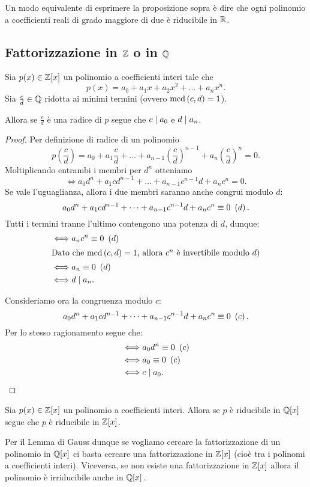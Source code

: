 Un modo equivalente di esprimere la proposizione sopra è dire che ogni polinomio a coefficienti reali di grado maggiore di due è riducibile in $\mathbb{R}$.

\subsection{Fattorizzazione in $\mathbb{Z}$ o in $\mathbb{Q}$}

\begin{proposition}
    Sia $p(x) \in \mathbb{Z}[x]$ un polinomio a coefficienti interi tale che \[
        p(x) = a_0 + a_1x + a_2x^2 + \dots + a_nx^n.    
    \] Sia $\frac{c}{d} \in \mathbb{Q}$ ridotta ai minimi termini (ovvero $\operatorname{mcd}\left(c, d\right) = 1$). 
    
    Allora se $\frac{c}{d}$ è una radice di $p$ segue che $c \mid a_0$ e $d \mid a_n$.
\end{proposition}
\begin{proof}
    Per definizione di radice di un polinomio \[
        p\left(\frac{c}{d}\right) = a_0 + a_1\frac{c}{d} + \dots + a_{n-1}\left(\frac{c}{d}\right)^{n-1} + a_n\left(\frac{c}{d}\right)^n = 0.
    \]
    Moltiplicando entrambi i membri per $d^n$ otteniamo \[
        \iff a_0d^n + a_1cd^{n-1} + \dots + a_{n-1}c^{n-1}d + a_nc^n = 0.
    \]
    Se vale l'uguaglianza, allora i due membri saranno anche congrui modulo $d$: \[
        a_0d^n + a_1cd^{n-1} + \dots + a_{n-1}c^{n-1}d + a_nc^n \equiv 0 \ \left(d\right).
    \]
    Tutti i termini tranne l'ultimo contengono una potenza di $d$, dunque:
    \begin{align*}
        \iff &a_nc^n \equiv 0 \ \left(d\right) \\
        \intertext{Dato che $\operatorname{mcd}\left(c, d\right) = 1$, allora $c^n$ è invertibile modulo $d$)}
        \iff &a_n \equiv 0 \ \left(d\right)\\
        \iff &d \mid a_n.
    \end{align*}

    Consideriamo ora la congruenza modulo $c$: \[
        a_0d^n + a_1cd^{n-1} + \dots + a_{n-1}c^{n-1}d + a_nc^n \equiv 0 \ \left(c\right).
    \]
    Per lo stesso ragionamento segue che:
    \begin{align*}
        \iff &a_0d^n \equiv 0 \ \left(c\right)\\
        \iff &a_0 \equiv 0 \ \left(c\right) \\
        \iff &c \mid a_0. \qedhere
    \end{align*}
\end{proof}

\begin{theorem}
     \label{lemma_di_Gauss}
    Sia $p(x) \in \mathbb{Z}[x]$ un polinomio a coefficienti interi. Allora se $p$ è riducibile in $\mathbb{Q}[x]$ segue che $p$ è riducibile in $\mathbb{Z}[x]$.
\end{theorem}

Per il Lemma di Gauss dunque se vogliamo cercare la fattorizzazione di un polinomio in $\mathbb{Q}[x]$ ci basta cercare una fattorizzazione in $\mathbb{Z}[x]$ (cioè tra i polinomi a coefficienti interi). Viceversa, se non esiste una fattorizzazione in $\mathbb{Z}[x]$ allora il polinomio è irriducibile anche in $\mathbb{Q}[x]$.
